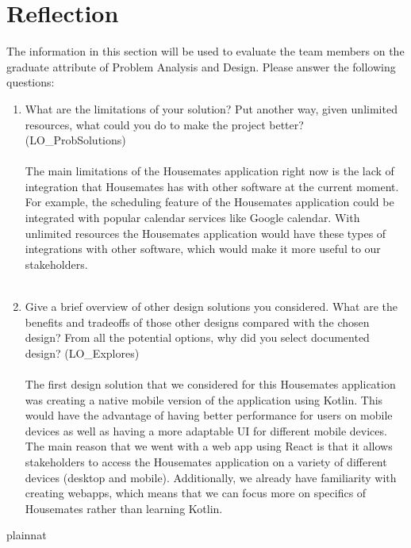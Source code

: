 \documentclass[12pt, titlepage]{article}
\begin{document}
\section{Reflection} \label{Reflection}

The information in this section will be used to evaluate the team members on the graduate attribute of Problem Analysis and Design.  Please answer the following questions:

\begin{enumerate}
  \item What are the limitations of your solution?  Put another way, given unlimited resources, what could you do to make the project better? (LO\_ProbSolutions)
  \\
  \\
  The main limitations of the Housemates application right now is the lack of integration that Housemates has with other software at the current moment. For example, the scheduling feature of the Housemates application could be integrated with popular calendar services like Google calendar. With unlimited resources the Housemates application would have these types of integrations with other software, which would make it more useful to our stakeholders.
  \\
  \\
  \item Give a brief overview of other design solutions you considered.  What are the benefits and tradeoffs of those other designs compared with the chosen design?  From all the potential options, why did you select documented design? (LO\_Explores)
  \\
  \\
  The first design solution that we considered for this Housemates application was creating a native mobile version of the application using Kotlin. This would have the advantage of having better performance for users on mobile devices as well as having a more adaptable UI for different mobile devices. The main reason that we went with a web app using React is that it allows stakeholders to access the Housemates application on a variety of different devices (desktop and mobile). Additionally, we already have familiarity with creating webapps, which means that we can focus more on specifics of Housemates rather than learning Kotlin.

  \end{enumerate}

\newpage{}


 {plainnat}

\end{document}

